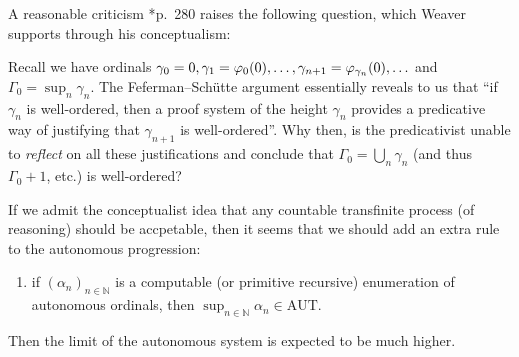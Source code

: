 \documentclass{beamer}
\begin{document}
\begin{frame}{A reasonable criticism}
  *{p.\ 280} raises the following question, which Weaver supports through his conceptualism:

  \vspace{1em}

  Recall we have ordinals $\gamma_0 = 0, \gamma_1 = \varphi_0\mleft(0\mright), \ldots, \gamma_{n + 1} = \varphi_{\gamma_n}\mleft(0\mright), \ldots$ and $\Gamma_0 = \sup_n \gamma_n$. The Feferman--Sch\"utte argument essentially reveals to us that ``if $\gamma_n$ is well-ordered, then a proof system of the height $\gamma_n$ provides a predicative way of justifying that $\gamma_{n + 1}$ is well-ordered''. Why then, is the predicativist unable to \emph{reflect} on all these justifications and conclude that $\Gamma_0 = \bigcup_n \gamma_n$ (and thus $\Gamma_0 + 1$, etc.) is well-ordered?

  \pause

  \vspace{1em}

  If we admit the conceptualist idea that any countable transfinite process (of reasoning) should be accpetable, then it seems that we should add an extra rule to the autonomous progression:
  \begin{enumerate}
    \setcounter{enumi}{\value{autenumi}}
    \item if $\left(\alpha_n\right)_{n \in \mathbb{N}}$ is a computable (or primitive recursive) enumeration of autonomous ordinals, then $\sup_{n \in \mathbb{N}} \alpha_n \in \mathrm{AUT}$.
  \end{enumerate}
  Then the limit of the autonomous system is expected to be much higher.
\end{frame}
\end{document}
